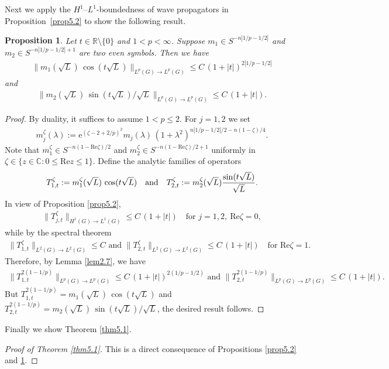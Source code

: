 \documentclass[a4paper,12pt]{amsart}
\numberwithin{equation}{section}
\newtheorem{proposition}[theorem]{Proposition}
\theoremstyle{definition}
\theoremstyle{remark}
\numberwithin{theorem}{section}
\newcommand{\R}{\mathbb{R}}
\newcommand{\e}{\mathrm{e}}
\renewcommand{\Re}{\mathrm{Re}}
\begin{document}
Next we apply the $H^1$--$L^1$-boundedness of wave propagators in Proposition~\ref{prop5.2} to show the following result.
\begin{proposition}\label{prop5.3}
Let $t\in\R\setminus\{0\}$ and $1<p<\infty$. Suppose $m_1\in S^{-n|1/p-1/2|}$ and $m_2\in S^{-n|1/p-1/2|+1}$ are two even symbols. Then we have
\begin{align*}
\|m_1(\sqrt{L})\,\cos(t\sqrt{L})\|_{L^p(G)\to L^p(G)}\leq C\,(1+|t|)^{2|1/p-1/2|}
\end{align*}
and
\begin{align*}
\|m_2(\sqrt{L})\,\sin(t\sqrt{L})/\sqrt{L}\|_{L^p(G)\to L^p(G)}\leq C\,(1+|t|).
\end{align*}
\end{proposition}
\begin{proof}
By duality, it suffices to assume $1<p\leq 2$. For $j=1,2$ we set
\begin{align*}
m^\zeta_j(\lambda):=\e^{(\zeta-2+2/p)^2}m_j(\lambda)\,(1+\lambda^2)^{n|1/p-1/2|/2-n(1-\zeta)/4}.
\end{align*}
Note that $m^\zeta_1\in S^{-n(1-\Re \zeta)/2}$ and $m^\zeta_2\in S^{-n(1-\Re \zeta)/2+1}$ uniformly in $\zeta\in \{z\in\mathbb{C}:0\leq \Re z\leq 1\}$. Define the analytic families of operators
\begin{align*}
T^\zeta_{1,t}:=m^\zeta_1(\sqrt{L})\,\cos(t\sqrt{L})\quad \mbox{and}\quad T^\zeta_{2,t}:=m^\zeta_2(\sqrt{L}){\sin(t\sqrt{L})\over\sqrt{L}}.
\end{align*}
In view of Proposition \ref{prop5.2},
\begin{align*}
\|T^\zeta_{j,t}\|_{H^1(G)\to L^1(G)}\leq C\,(1+|t|) \quad\mbox{for } j=1,2,\ \Re\zeta=0,
\end{align*}
while by the spectral theorem
\begin{align*}
\|T^\zeta_{1,t}\|_{L^2(G)\to L^2(G)}\leq C\mbox{ and } \|T^\zeta_{2,t}\|_{L^2(G)\to L^2(G)}\leq C\,(1+|t|)\quad \mbox{for } \Re\zeta=1.
\end{align*}
Therefore, by Lemma \ref{lem2.7}, we have
\begin{align*}
\|T^{2(1-1/p)}_{1,t}\|_{L^p(G)\to L^p(G)}\leq C\,(1+|t|)^{2(1/p-1/2)} \mbox{ and } \|T^{2(1-1/p)}_{2,t}\|_{L^p(G)\to L^p(G)}\leq C\,(1+|t|).
\end{align*}
But $T^{2(1-1/p)}_{1,t}=m_1(\sqrt{L})\,\cos(t\sqrt{L})$ and $T^{2(1-1/p)}_{2,t}=m_2(\sqrt{L})\,\sin(t\sqrt{L})/\sqrt{L}$, the desired result follows.
\end{proof}
Finally we show Theorem \ref{thm5.1}.
\begin{proof}[Proof of Theorem \ref{thm5.1}]
This is a direct consequence of Propositions \ref{prop5.2} and \ref{prop5.3}.
\end{proof}
\end{document}
